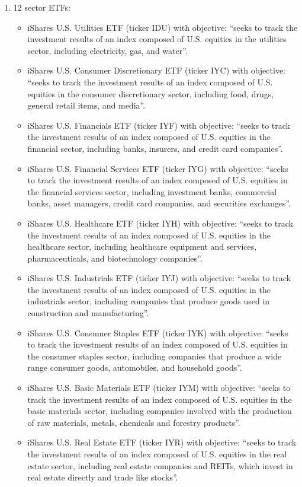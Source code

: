 \begin{enumerate}[label=(\alph*)]
\item 12 sector ETFs:

\begin{itemize}
 \item iShares U.S. Utilities ETF (ticker IDU) with objective: “seeks to track the investment results of an index composed of U.S. equities in the utilities sector, including electricity, gas, and water”.
\item iShares U.S. Consumer Discretionary ETF (ticker IYC) with objective: “seeks to track the investment results of an index composed of U.S. equities in the consumer discretionary sector, including food, drugs, general retail items, and media”.
\item iShares U.S. Financials ETF (ticker IYF) with objective: “seeks to track the investment results of an index composed of U.S. equities in the financial sector, including banks, insurers, and credit card companies”.
\item iShares U.S. Financial Services ETF (ticker IYG) with objective: “seeks to track the investment results of an index composed of U.S. equities in the financial services sector, including investment banks, commercial banks, asset managers, credit card companies, and securities exchanges”.
\item iShares U.S. Healthcare ETF (ticker IYH) with objective: “seeks to track the investment results of an index composed of U.S. equities in the healthcare sector, including healthcare equipment and services, pharmaceuticals, and biotechnology companies”.
\item iShares U.S. Industrials ETF (ticker IYJ) with objective: “seeks to track the investment results of an index composed of U.S. equities in the industrials sector, including companies that produce goods used in construction and manufacturing”.
\item iShares U.S. Consumer Staples ETF (ticker IYK) with objective: “seeks to track the investment results of an index composed of U.S. equities in the consumer staples sector, including companies that produce a wide range consumer goods, automobiles, and household goods”.
\item iShares U.S. Basic Materials ETF (ticker IYM) with objective: “seeks to track the investment results of an index composed of U.S. equities in the basic materials sector, including companies involved with the production of raw materials, metals, chemicals and forestry products”.
\item iShares U.S. Real Estate ETF (ticker IYR) with objective: “seeks to track the investment results of an index composed of U.S. equities in the real estate sector, including real estate companies and REITs, which invest in real estate directly and trade like stocks”.

\end{itemize}
\end{enumerate}
